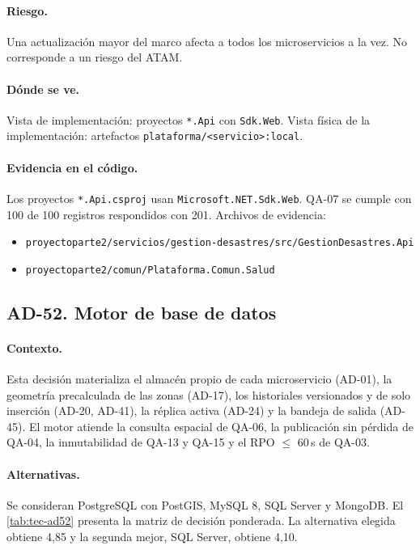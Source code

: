 \paragraph{Riesgo.} Una actualización mayor del marco afecta a todos los microservicios a la vez.
No corresponde a un riesgo del ATAM.

\paragraph{Dónde se ve.} Vista de implementación: proyectos \texttt{*.Api} con \texttt{Sdk.Web}.
Vista física de la implementación: artefactos \texttt{plataforma/<servicio>:local}.

\paragraph{Evidencia en el código.} Los proyectos \texttt{*.Api.csproj} usan \texttt{Microsoft.NET.Sdk.Web}. QA-07 se cumple con 100 de 100 registros respondidos con 201.
Archivos de evidencia:
{\raggedright
\begin{itemize}
  \item \texttt{proyectoparte2/\br{}servicios/\br{}gestion-desastres/\br{}src/\br{}GestionDesastres.Api}
  \item \texttt{proyectoparte2/\br{}comun/\br{}Plataforma.Comun.Salud}
\end{itemize}
\par}

\subsection{AD-52. Motor de base de datos}
\label{sec:tec-ad52}

\paragraph{Contexto.} Esta decisión materializa el almacén propio de cada microservicio (AD-01), la geometría precalculada de las zonas (AD-17), los historiales versionados y de solo inserción (AD-20, AD-41), la réplica activa (AD-24) y la bandeja de salida (AD-45).
El motor atiende la consulta espacial de QA-06, la publicación sin pérdida de QA-04, la inmutabilidad de QA-13 y QA-15 y el RPO $\le$ 60\,s de QA-03.

\paragraph{Alternativas.} Se consideran PostgreSQL con PostGIS, MySQL 8, SQL Server y MongoDB.
El \cref{tab:tec-ad52} presenta la matriz de decisión ponderada.
La alternativa elegida obtiene 4,85 y la segunda mejor, SQL Server, obtiene 4,10.

